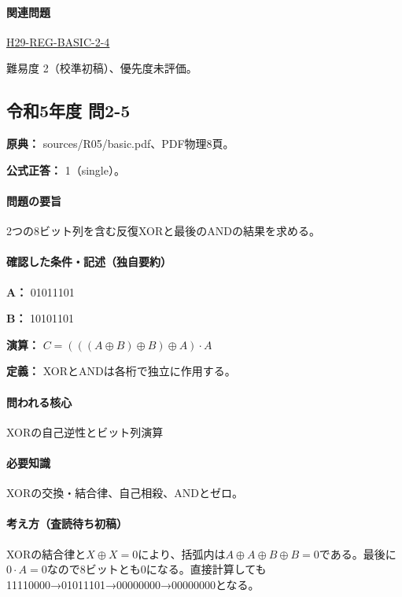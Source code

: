 \paragraph{関連問題} \hyperref[q:h29-reg-basic-2-4]{H29-REG-BASIC-2-4}

\par 難易度 2（校準初稿）、優先度未評価。

\subsection{令和5年度 問2-5}
\label{q:r05-reg-basic-2-5}

\noindent\textbf{原典：} sources/R05/basic.pdf、PDF物理8頁。

\textbf{公式正答：} 1（single）。

\paragraph{問題の要旨} 2つの8ビット列を含む反復XORと最後のANDの結果を求める。

\paragraph{確認した条件・記述（独自要約）}\mbox{}\par

\noindent\textbf{A：} 01011101\par

\noindent\textbf{B：} 10101101\par

\noindent\textbf{演算：} \(C=(((A\oplus B)\oplus B)\oplus A)\cdot A\)\par

\noindent\textbf{定義：} XORとANDは各桁で独立に作用する。\par

\paragraph{問われる核心} XORの自己逆性とビット列演算

\paragraph{必要知識} XORの交換・結合律、自己相殺、ANDとゼロ。

\paragraph{考え方（査読待ち初稿）} XORの結合律と\(X\oplus X=0\)により、括弧内は\(A\oplus A\oplus B\oplus B=0\)である。最後に\(0\cdot A=0\)なので8ビットとも0になる。直接計算しても11110000→01011101→00000000→00000000となる。

